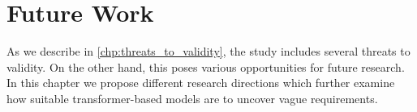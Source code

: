 \chapter{Future Work}
\label{chp:future_work}
As we describe in \cref{chp:threats_to_validity}, the study includes several threats to validity.
On the other hand, this poses various opportunities for future research.
In this chapter we propose different research directions which further examine how suitable transformer-based models are to uncover vague requirements.





